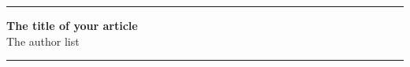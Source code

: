 \documentclass[11pt, a4paper, twocolumn, unnumberedsections]{article}
\begin{document}
\thispagestyle{empty}
\onecolumn
\hrule
\begin{center}
  {\Large
    {\bf The title of your article} \\
    The author list \\
  }
\end{center}
\hrule
\vskip 10pt
\normalsize

\setcounter{tocdepth}{2}
\tableofcontents \label{toc}
\vfill

\begin{abstract}
  \lipsum[1-2]
\end{abstract}

\pagebreak




\twocolumn









\end{document}
